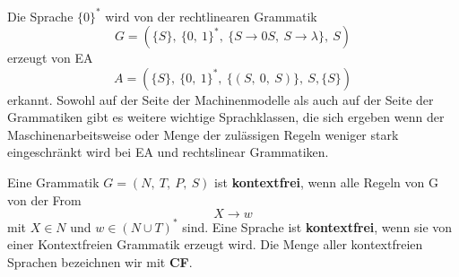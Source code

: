     Die Sprache \(\{0\}^*\) wird von der rechtlinearen Grammatik \[ G = (\{S\},\ \{0,\ 1\}^*,\ \{S \to 0S,\ S \to \lambda\},\ S)\] erzeugt von EA \[A = (\{S\},\ \{0,\ 1\}^*,\ \{(S,\ 0,\ S)\},\ S, \{S\})\] erkannt. Sowohl auf der Seite der Machinenmodelle als auch auf der Seite der Grammatiken gibt es weitere wichtige Sprachklassen, die sich ergeben wenn der Maschinenarbeitsweise oder Menge der zulässigen Regeln weniger stark eingeschränkt wird bei EA und rechtslinear Grammatiken.

    Eine Grammatik \(G = (N,\ T,\ P,\ S)\) ist \textbf{kontextfrei}, wenn alle Regeln von G von der From \[X \to w\] mit \(X \in N\) und \(w \in (N \cup T)^*\) sind. Eine Sprache ist \textbf{kontextfrei}, wenn sie von einer Kontextfreien Grammatik erzeugt wird. Die Menge aller kontextfreien Sprachen bezeichnen wir mit \textbf{CF}.

